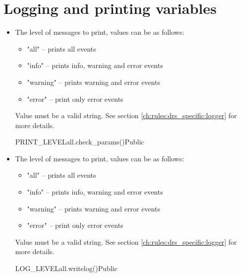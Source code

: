 \fi

\clearpage
\newpage
\section{Logging and printing variables}
\label{ch:variables:log_print}

\begin{itemize}

\item {}
{The level of messages to print, values can be as follows:
\begin{itemize}
	\item "all" -- prints all events
	\item "info" -- prints info, warning and error events
	\item "warning" -- prints warning and error events
	\item "error" -- print only error events
\end{itemize}
Value must be a valid string. \ifdevguide See section \ref{ch:rules:drs_specific:logger} for more details. \fi}
{PRINT\_LEVEL}{all}{\AllRecipes}{\configtxtfile}{\spirouConfig.check\_params()}{Public}

\item {}
{The level of messages to print, values can be as follows:
\begin{itemize}
	\item "all" -- prints all events
	\item "info" -- prints info, warning and error events
	\item "warning" -- prints warning and error events
	\item "error" -- print only error events
\end{itemize}
Value must be a valid string. \ifdevguide See section \ref{ch:rules:drs_specific:logger} for more details. \fi}
{LOG\_LEVEL}{all}{\AllRecipes}{\configtxtfile}{\spirouConfig.writelog()}{Public}



\end{itemize}
